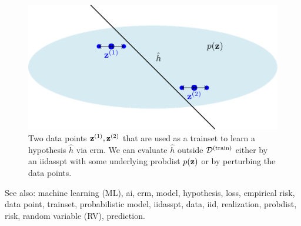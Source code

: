 \documentclass{article}
\begin{document}
 \begin{figure}[H]
 \centering
 \includegraphics[width=0.8\linewidth]{blog_posts/images/generalization_tikz.png}
 \caption{Two data points ${\bf z}^{(1)},{\bf z}^{(2)}$ that are used as a trainset
 to learn a hypothesis $\hat{h}$ via erm. We can evaluate $\hat{h}$
 outside $\mathcal{D}^{(\rm train)}$ either by an iidasspt with some underlying probdist $p({\bf z})$
 or by perturbing the data points.}
 \label{fig:polynomial_fit_dict}
 \end{figure}
 See also: machine learning (ML), ai, erm, model, hypothesis, loss, empirical risk, data point, trainset, probabilistic model, iidasspt, data, iid, realization, probdist, risk, random variable (RV), prediction.
 
\end{document}
